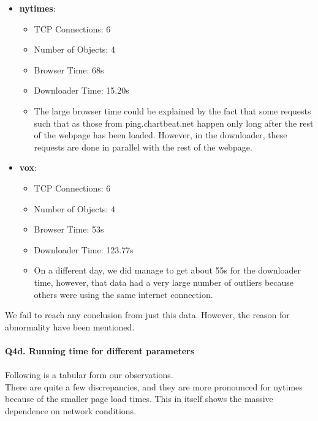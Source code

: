 \documentclass[12pt]{article}
\begin{document}
\begin{itemize}
\item \textbf{nytimes}: 
\begin{itemize}
	\item TCP Connections: 6
	\item Number of Objects: 4
	\item Browser Time: 68s
	\item Downloader Time: 15.20s
\item The large browser time could be explained by the fact that some requests such that as those from ping.chartbeat.net happen only long after the rest of the webpage has been loaded. However, in the downloader, these requests are done in parallel with the rest of the webpage.
\end{itemize}

\item \textbf{vox}:
\begin{itemize}
	\item TCP Connections: 6
	\item Number of Objects: 4
	\item Browser Time: 53s
	\item Downloader Time: 123.77s
	\item On a different day, we did manage to get about 55s for the downloader time, however, that data had a very large number of outliers because others were using the same internet connection.
\end{itemize}
\end{itemize}
We fail to reach any conclusion from just this data. However, the reason for abnormality have been mentioned.
~\\\\
{\bfseries Q4d. Running time for different parameters}
\\\\
Following is a tabular form our observations.\\
There are quite a few discrepancies, and they are more pronounced for nytimes because of the smaller page load times. This in itself shows the massive dependence on network conditions. 
\\\\
\hspace*{-1cm}
\end{document}
